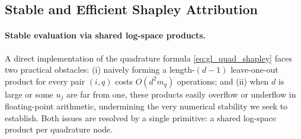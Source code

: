 \documentclass{article}
\newtheorem{lemma}{Lemma}
\begin{document}





\subsection{Stable and Efficient Shapley Attribution}
\label{subsec:stable_efficient}

\paragraph{Stable evaluation via shared log-space products.}
A direct implementation of the quadrature formula \cref{eq:gl_quad_shapley} faces two practical obstacles: (i) naively forming a length-$(d{-}1)$ leave-one-out product for every pair $(i,q)$ costs $O(d^2 m_q)$ operations; and (ii) when $d$ is large or some $u_j$ are far from one, these products easily overflow or underflow in floating-point arithmetic, undermining the very numerical stability we seek to establish. Both issues are resolved by a single primitive: a shared log-space product per quadrature node.
\end{document}
